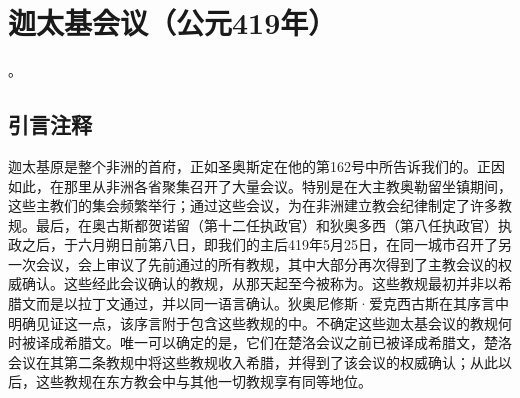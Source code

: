 
\chapter{迦太基会议（公元419年）}


。\par


\section{引言注释}

\par

迦太基原是整个非洲的首府，正如圣奥斯定在他的第162号中所告诉我们的。正因如此，在那里从非洲各省聚集召开了大量会议。特别是在大主教奥勒留坐镇期间，这些主教们的集会频繁举行；通过这些会议，为在非洲建立教会纪律制定了许多教规。最后，在奥古斯都贺诺留（第十二任执政官）和狄奥多西（第八任执政官）执政之后，于六月朔日前第八日，即我们的主后419年5月25日，在同一城市召开了另一次会议，会上审议了先前通过的所有教规，其中大部分再次得到了主教会议的权威确认。这些经此会议确认的教规，从那天起至今被称为。这些教规最初并非以希腊文而是以拉丁文通过，并以同一语言确认。狄奥尼修斯·爱克西古斯在其序言中明确见证这一点，该序言附于包含这些教规的中。不确定这些迦太基会议的教规何时被译成希腊文。唯一可以确定的是，它们在楚洛会议之前已被译成希腊文，楚洛会议在其第二条教规中将这些教规收入希腊，并得到了该会议的权威确认；从此以后，这些教规在东方教会中与其他一切教规享有同等地位。\par


